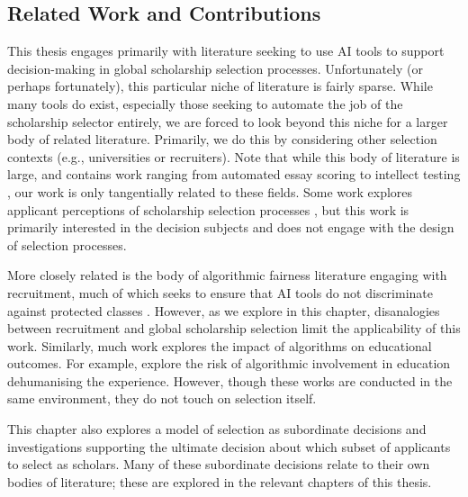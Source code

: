 \subsection{Related Work and Contributions}\label{ssec:context_related_work}
This thesis engages primarily with literature seeking to use AI tools to support decision-making in global scholarship selection processes. Unfortunately (or perhaps fortunately), this particular niche of literature is fairly sparse. While many tools do exist, especially those seeking to automate the job of the scholarship selector entirely, we are forced to look beyond this niche for a larger body of related literature. Primarily, we do this by considering other selection contexts (e.g., universities or recruiters). Note that while this body of literature is large, and contains work ranging from automated essay scoring to intellect testing \cite{cozma_automated_2018,condon2014international}, our work is only tangentially related to these fields. Some work explores applicant perceptions of scholarship selection processes \cite{10.1145/3351095.3372867}, but this work is primarily interested in the decision subjects and does not engage with the design of selection processes.

More closely related is the body of algorithmic fairness literature engaging with recruitment, much of which seeks to ensure that AI tools do not discriminate against protected classes \cite{dwork_fairness_2012}. However, as we explore in this chapter, disanalogies between recruitment and global scholarship selection limit the applicability of this work. Similarly, much work explores the impact of algorithms on educational outcomes. For example, \textcite{NISSENBAUM1998237} explore the risk of algorithmic involvement in education dehumanising the experience. However, though these works are conducted in the same environment, they do not touch on selection itself.

This chapter also explores a model of selection as subordinate decisions and investigations supporting the ultimate decision about which subset of applicants to select as scholars. Many of these subordinate decisions relate to their own bodies of literature; these are explored in the relevant chapters of this thesis.

